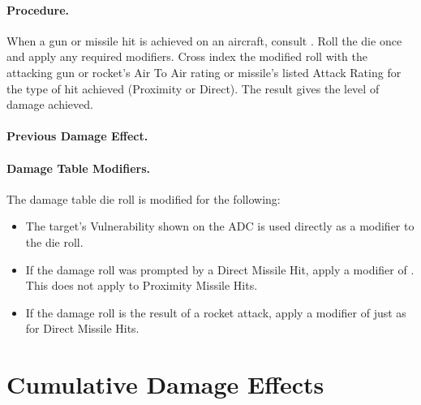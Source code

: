 {\paragraph{Procedure.} When a gun or missile hit is achieved on an aircraft, consult . Roll the die once and apply any required modifiers. Cross index the modified roll with the attacking gun or rocket's Air To Air rating or missile's listed Attack Rating for the type of hit achieved (Proximity or Direct). The result gives the level of damage achieved.

\paragraph{Previous Damage Effect.} 

\paragraph{Damage Table Modifiers.} The damage table die roll is modified for the following:

\begin{itemize}

    \item{} The target's Vulnerability shown on the ADC is used directly as a modifier to the die roll.
    
    \item{} If the damage roll was prompted by a Direct Missile Hit, apply a modifier of . This does not apply to Proximity Missile Hits.
    
    \item{} If the damage roll is the result of a rocket attack, apply a modifier of  just as for Direct Missile Hits.
    
\end{itemize}


\section{Cumulative Damage Effects}

}
